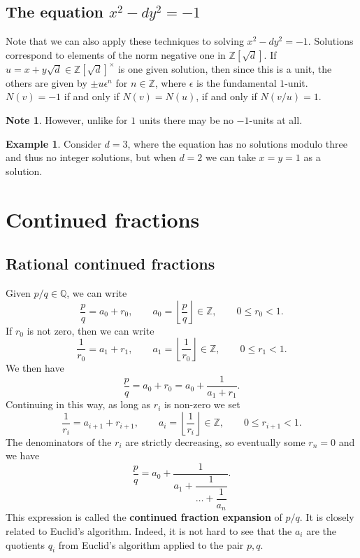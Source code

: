 \documentclass{article}
\newcommand{\Z}{\mathbb{Z}}
\newcommand{\Q}{\mathbb{Q}}
\newcommand{\rb}[1]{\left( #1 \right)}
\renewcommand{\sb}[1]{\left[ #1 \right]}
\newcommand{\fb}[1]{\left\lfloor #1 \right\rfloor}
\theoremstyle{definition}\newtheorem{definition}{Definition}
\theoremstyle{definition}\newtheorem{remark}[definition]{Remark}
\theoremstyle{definition}\newtheorem*{example}{Example}
\theoremstyle{definition}\newtheorem*{note}{Note}
\begin{document}

\subsection{The equation $ x^2 - dy^2 = - 1 $}

Note that we can also apply these techniques to solving $ x^2 - dy^2 = -1 $. Solutions correspond to elements of the norm negative one in $ \Z\sb{\sqrt{d}} $. If $ u = x + y\sqrt{d} \in \Z\sb{\sqrt{d}}^\times $ is one given solution, then since this is a unit, the others are given by $ \pm u\epsilon^n $ for $ n \in \Z $, where $ \epsilon $ is the fundamental $ 1 $-unit. $ N\rb{v} = -1 $ if and only if $ N\rb{v} = N\rb{u} $, if and only if $ N\rb{v / u} = 1 $.

\begin{note}
However, unlike for $ 1 $ units there may be no $ -1 $-units at all.
\end{note}

\begin{example}
Consider $ d = 3 $, where the equation has no solutions modulo three and thus no integer solutions, but when $ d = 2 $ we can take $ x = y = 1 $ as a solution.
\end{example}

\section{Continued fractions}

\subsection{Rational continued fractions}

Given $ p / q \in \Q $, we can write
$$ \dfrac{p}{q} = a_0 + r_0, \qquad a_0 = \fb{\dfrac{p}{q}} \in \Z, \qquad 0 \le r_0 < 1. $$
If $ r_0 $ is not zero, then we can write
$$ \dfrac{1}{r_0} = a_1 + r_1, \qquad a_1 = \fb{\dfrac{1}{r_0}} \in \Z, \qquad 0 \le r_1 < 1. $$
We then have
$$ \dfrac{p}{q} = a_0 + r_0 = a_0 + \dfrac{1}{a_1 + r_1}. $$
Continuing in this way, as long as $ r_i $ is non-zero we set
$$ \dfrac{1}{r_i} = a_{i + 1} + r_{i + 1}, \qquad a_i = \fb{\dfrac{1}{r_i}} \in \Z, \qquad 0 \le r_{i + 1} < 1. $$
The denominators of the $ r_i $ are strictly decreasing, so eventually some $ r_n = 0 $ and we have
$$ \dfrac{p}{q} = a_0 + \dfrac{1}{a_1 + \dfrac{1}{\dots + \dfrac{1}{a_n}}}. $$
This expression is called the \textbf{continued fraction expansion} of $ p / q $. It is closely related to Euclid's algorithm. Indeed, it is not hard to see that the $ a_i $ are the quotients $ q_i $ from Euclid's algorithm applied to the pair $ p, q $.
\end{document}

